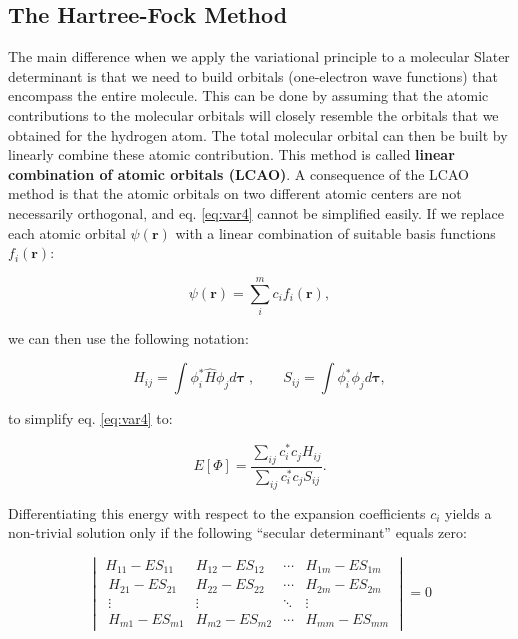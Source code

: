 \documentclass[
  9pt,
]{extbook}
\theoremstyle{definition}
\theoremstyle{definition}
\theoremstyle{definition}
\theoremstyle{remark}
\begin{document}
\hypertarget{the-hartree-fock-method}{%
\subsection{The Hartree-Fock Method}\label{the-hartree-fock-method}}

The main difference when we apply the variational principle to a molecular Slater determinant is that we need to build orbitals (one-electron wave functions) that encompass the entire molecule. This can be done by assuming that the atomic contributions to the molecular orbitals will closely resemble the orbitals that we obtained for the hydrogen atom. The total molecular orbital can then be built by linearly combine these atomic contribution. This method is called \textbf{linear combination of atomic orbitals (LCAO)}. A consequence of the LCAO method is that the atomic orbitals on two different atomic centers are not necessarily orthogonal, and eq. \eqref{eq:var4} cannot be simplified easily. If we replace each atomic orbital \(\psi(\mathbf{r})\) with a linear combination of suitable basis functions \(f_i(\mathbf{r})\):

\begin{equation}
\psi(\mathbf{r}) = \sum_i^m c_{i} f_i(\mathbf{r}),
\label{eq:molham10}
\end{equation}

we can then use the following notation:

\begin{equation}
\displaystyle H_{ij} = \int \phi_i^* {\hat H} \phi_j d\mathbf{\tau}\;, \qquad \displaystyle S_{ij} = \int \phi_i^* \phi_jd\mathbf{\tau},
\label{eq:molham11}
\end{equation}

to simplify eq. \eqref{eq:var4} to:

\begin{equation}
E[\Phi] = \frac{\sum_{ij} c_i^* c_j H_{ij}}{\sum_{ij} c_i^* c_j S_{ij}}.
\label{eq:molham11b}
\end{equation}

Differentiating this energy with respect to the expansion coefficients \(c_i\) yields a non-trivial solution only if the following ``secular determinant'' equals zero:

\begin{equation}
\begin{vmatrix}
H_{11}-ES_{11}   & H_{12}-ES_{12}   & \cdots & H_{1m}-ES_{1m}\\\
H_{21}-ES_{21}   & H_{22}-ES_{22}   & \cdots & H_{2m}-ES_{2m}\\\
\vdots           &   \vdots         & \ddots & \vdots\\\
H_{m1}-ES_{m1}   & H_{m2}-ES_{m2}   & \cdots & H_{mm}-ES_{mm}
\end{vmatrix}=0
\label{eq:molham12}
\end{equation}
\end{document}
